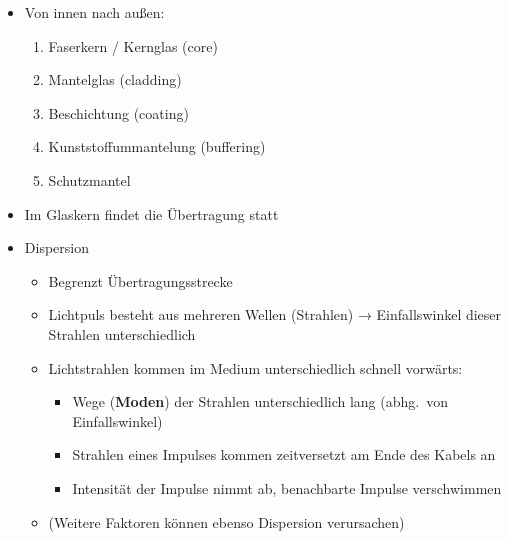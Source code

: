 \begin{itemize}
    \item Von innen nach außen:
    \begin{enumerate}
        \item Faserkern / Kernglas (core)
        \item Mantelglas (cladding)
        \item Beschichtung (coating)
        \item Kunststoffummantelung (buffering)
        \item Schutzmantel
    \end{enumerate}
    \item Im Glaskern findet die Übertragung statt
\end{itemize}

\begin{itemize}
    \item Dispersion
    \begin{itemize}
        \item Begrenzt Übertragungsstrecke
        \item Lichtpuls besteht aus mehreren Wellen (Strahlen) → Einfallswinkel dieser Strahlen unterschiedlich
        \item Lichtstrahlen kommen im Medium unterschiedlich schnell vorwärts:
        \begin{itemize}
            \item Wege (\textbf{Moden}) der Strahlen unterschiedlich lang (abhg.\ von Einfallswinkel)
            \item Strahlen eines Impulses kommen zeitversetzt am Ende des Kabels an
            \item Intensität der Impulse nimmt ab, benachbarte Impulse verschwimmen
        \end{itemize}
        \item (Weitere Faktoren können ebenso Dispersion verursachen)
    \end{itemize}
\end{itemize}

